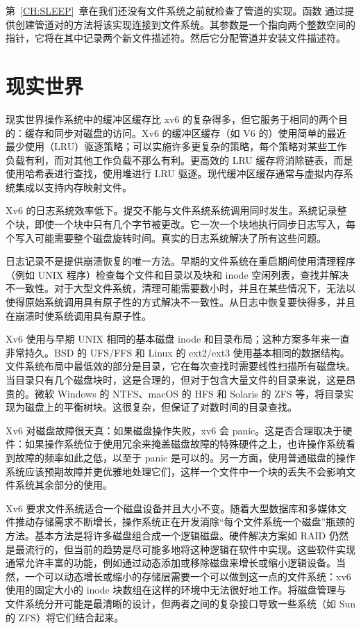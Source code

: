 第~\ref{CH:SLEEP}~章在我们还没有文件系统之前就检查了管道的实现。函数  通过提供创建管道对的方法将该实现连接到文件系统。其参数是一个指向两个整数空间的指针，它将在其中记录两个新文件描述符。然后它分配管道并安装文件描述符。
\section{现实世界}

现实世界操作系统中的缓冲区缓存比 xv6 的复杂得多，但它服务于相同的两个目的：缓存和同步对磁盘的访问。Xv6 的缓冲区缓存（如 V6 的）使用简单的最近最少使用（LRU）驱逐策略；可以实施许多更复杂的策略，每个策略对某些工作负载有利，而对其他工作负载不那么有利。更高效的 LRU 缓存将消除链表，而是使用哈希表进行查找，使用堆进行 LRU 驱逐。现代缓冲区缓存通常与虚拟内存系统集成以支持内存映射文件。

Xv6 的日志系统效率低下。提交不能与文件系统系统调用同时发生。系统记录整个块，即使一个块中只有几个字节被更改。它一次一个块地执行同步日志写入，每个写入可能需要整个磁盘旋转时间。真实的日志系统解决了所有这些问题。

日志记录不是提供崩溃恢复的唯一方法。早期的文件系统在重启期间使用清理程序（例如 UNIX  程序）检查每个文件和目录以及块和 inode 空闲列表，查找并解决不一致性。对于大型文件系统，清理可能需要数小时，并且在某些情况下，无法以使得原始系统调用具有原子性的方式解决不一致性。从日志中恢复要快得多，并且在崩溃时使系统调用具有原子性。

Xv6 使用与早期 UNIX 相同的基本磁盘 inode 和目录布局；这种方案多年来一直非常持久。BSD 的 UFS/FFS 和 Linux 的 ext2/ext3 使用基本相同的数据结构。文件系统布局中最低效的部分是目录，它在每次查找时需要线性扫描所有磁盘块。当目录只有几个磁盘块时，这是合理的，但对于包含大量文件的目录来说，这是昂贵的。微软 Windows 的 NTFS、macOS 的 HFS 和 Solaris 的 ZFS 等，将目录实现为磁盘上的平衡树块。这很复杂，但保证了对数时间的目录查找。

Xv6 对磁盘故障很天真：如果磁盘操作失败，xv6 会 panic。这是否合理取决于硬件：如果操作系统位于使用冗余来掩盖磁盘故障的特殊硬件之上，也许操作系统看到故障的频率如此之低，以至于 panic 是可以的。另一方面，使用普通磁盘的操作系统应该预期故障并更优雅地处理它们，这样一个文件中一个块的丢失不会影响文件系统其余部分的使用。

Xv6 要求文件系统适合一个磁盘设备并且大小不变。随着大型数据库和多媒体文件推动存储需求不断增长，操作系统正在开发消除“每个文件系统一个磁盘”瓶颈的方法。基本方法是将许多磁盘组合成一个逻辑磁盘。硬件解决方案如 RAID 仍然是最流行的，但当前的趋势是尽可能多地将这种逻辑在软件中实现。这些软件实现通常允许丰富的功能，例如通过动态添加或移除磁盘来增长或缩小逻辑设备。当然，一个可以动态增长或缩小的存储层需要一个可以做到这一点的文件系统：xv6 使用的固定大小的 inode 块数组在这样的环境中无法很好地工作。将磁盘管理与文件系统分开可能是最清晰的设计，但两者之间的复杂接口导致一些系统（如 Sun 的 ZFS）将它们结合起来。

